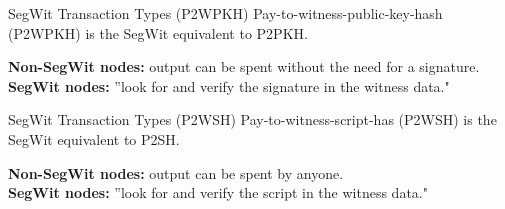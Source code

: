 \documentclass[handout]{beamer}
\begin{document}
\begin{frame}{SegWit Transaction Types (P2WPKH)}
	Pay-to-witness-public-key-hash (P2WPKH) is the SegWit equivalent to P2PKH.\\
	\vspace{1.5em}
	
	\vspace{1.5em}

	\textbf{Non-SegWit nodes:} output can be spent without the need for a signature.\\
	\vspace{0.5em}
	\textbf{SegWit nodes:} ''look for and verify the signature in the witness data."
\end{frame}

\begin{frame}{SegWit Transaction Types (P2WSH)}
	Pay-to-witness-script-has (P2WSH) is the SegWit equivalent to P2SH.\\
	\vspace{1.5em}
	
	\vspace{1.5em}

	\textbf{Non-SegWit nodes:} output can be spent by anyone.\\
	\vspace{0.5em}
	\textbf{SegWit nodes:} ''look for and verify the script in the witness data."
\end{frame}
\end{document}
